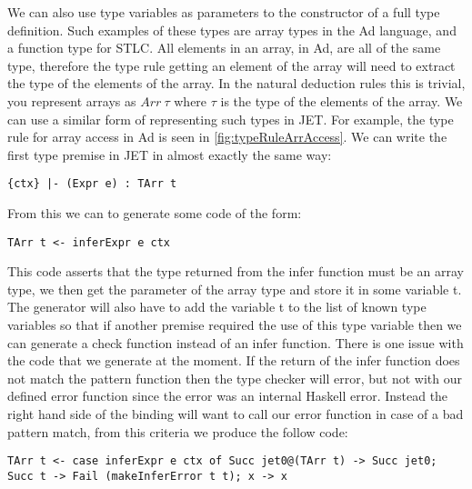 We can also use type variables as parameters to the constructor of a full type definition.
Such examples of these types are array types in the Ad language, and a function type for STLC.
All elements in an array, in Ad, are all of the same type, therefore the type rule getting an element of the array will need to extract the type of the elements of the array.
In the natural deduction rules this is trivial, you represent arrays as $Arr~\tau$ where $\tau$ is the type of the elements of the array.
We can use a similar form of representing such types in JET.
For example, the type rule for array access in Ad is seen in \autoref{fig:typeRuleArrAccess}.
We can write the first type premise in JET in almost exactly the same way:
\begin{lstlisting}[numbers=none]
{ctx} |- (Expr e) : TArr t 
\end{lstlisting}
From this we can to generate some code of the form:
\begin{lstlisting}[numbers=none]
TArr t <- inferExpr e ctx
\end{lstlisting}
This code asserts that the type returned from the infer function must be an array type, we then get the parameter of the array type and store it in some variable t.
The generator will also have to add the variable t to the list of known type variables so that if another premise required the use of this type variable then we can generate a check function instead of an infer function.
There is one issue with the code that we generate at the moment.
If the return of the infer function does not match the pattern function then the type checker will error, but not with our defined error function since the error was an internal Haskell error.
Instead the right hand side of the binding will want to call our error function in case of a bad pattern match, from this criteria we produce the follow code:
\begin{lstlisting}[numbers=none]
TArr t <- case inferExpr e ctx of Succ jet0@(TArr t) -> Succ jet0; Succ t -> Fail (makeInferError t t); x -> x
\end{lstlisting}

